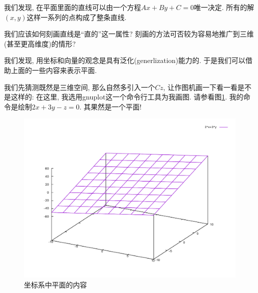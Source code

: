 我们发现, 在平面里面的直线可以由一个方程$Ax+By+C=0$唯一决定. 所有的解$(x,y)$这样一系列的点构成了整条直线. 

\begin{bonus}
	我们应该如何刻画直线是``直的''这一属性? 刻画的方法可否较为容易地推广到三维(甚至更高维度)的情形? 
\end{bonus}

我们发现, 用坐标和向量的观念是具有泛化(generlization)能力的. 于是我们可以借助上面的一些内容来表示平面. 

我们先猜测既然是三维空间, 那么自然多引入一个$Cz$, 让作图机画一下看一看是不是这样的: 在这里, 我选用gnuplot这一个命令行工具为我画图. 请参看图\ref{fig:plane-in-space}. 我的命令是绘制$2x+3y-z=0$. 其果然是一个平面! 

\begin{figure}
	\begin{center}
		\includegraphics[scale=0.5]{space-ana-geo/line-look.pdf}
	\end{center}
	\label{fig:plane-in-space}
	\caption{坐标系中平面的内容}
\end{figure}

